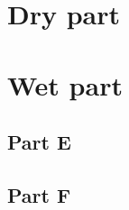 \documentclass[a4paper,12pt]{article}
\begin{document}
    

	\section{Dry part}
    \subsection{}
    
    \subsection{}
    
    \subsection{}
    
    \subsection{}
    
    \subsection{}
    
    \subsection{}
    
    \subsection{}
    
    \subsection{}
    
    \subsection{}
    
    \subsection{}
    

    \newpage

    \section{Wet part}
    \subsection{Part E}
    
    \subsection{Part F}
    
\end{document}

